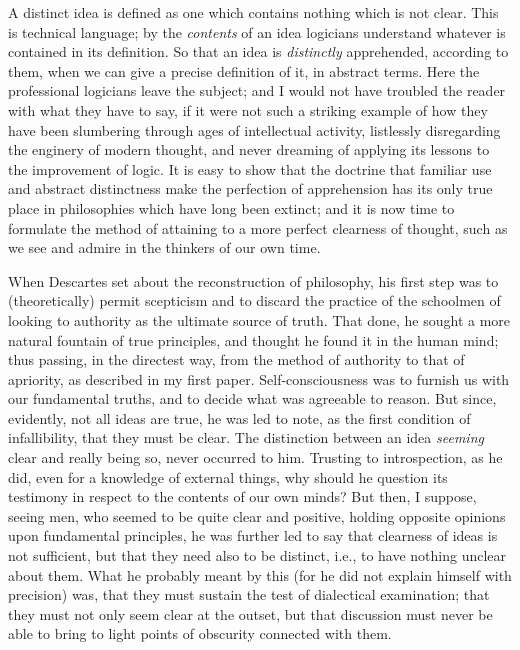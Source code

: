 A distinct idea is defined as one which contains nothing which is not clear. This is technical language; by the \emph{contents} of an idea logicians understand whatever is contained in its definition. So that an idea is \emph{distinctly} apprehended, according to them, when we can give a precise definition of it, in abstract terms. Here the professional logicians leave the subject; and I would not have troubled the reader with what they have to say, if it were not such a striking example of how they have been slumbering through ages of intellectual activity, listlessly disregarding the enginery of modern thought, and never dreaming of applying its lessons to the improvement of logic. It is easy to show that the doctrine that familiar use and abstract distinctness make the perfection of apprehension has its only true place in philosophies which have long been extinct; and it is now time to formulate the method of attaining to a more perfect clearness of thought, such as we see and admire in the thinkers of our own time.

When Descartes set about the reconstruction of philosophy, his first step was to (theoretically) permit scepticism and to discard the practice of the schoolmen of looking to authority as the ultimate source of truth. That done, he sought a more natural fountain of true  principles, and thought he found it in the human mind; thus passing, in the directest way, from the method of authority to that of apriority, as described in my first paper. Self-consciousness was to furnish us with our fundamental truths, and to decide what was agreeable to reason. But since, evidently, not all ideas are true, he was led to note, as the first condition of infallibility, that they must be clear. The distinction between an idea \emph{seeming} clear and really being so, never occurred to him.  Trusting to introspection, as he did, even for a knowledge of external things, why should he question its testimony in respect to the contents of our own minds? But then, I suppose, seeing men, who seemed to be quite clear and positive, holding opposite opinions upon fundamental principles, he was further led to say that clearness of ideas is not sufficient, but that they need also to be distinct, i.e., to have nothing unclear about them. What he probably meant by this (for he did not explain himself with precision) was, that they must sustain the test of dialectical examination; that they must not only seem clear at the outset, but that discussion must never be able to bring to light points of obscurity connected with them.


